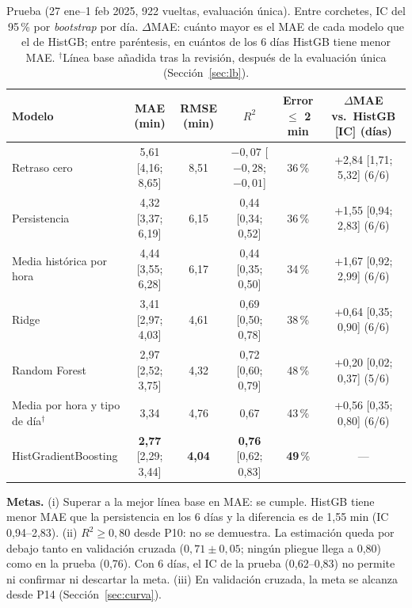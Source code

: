 \documentclass[conference,spanish]{IEEEtran}
\begin{document}
\begin{table}[t]
\centering
\caption{Prueba (27 ene--1 feb 2025, 922 vueltas, evaluación única). Entre corchetes, IC del 95\,\% por \textit{bootstrap} por día. $\Delta$MAE: cuánto mayor es el MAE de cada modelo que el de HistGB; entre paréntesis, en cuántos de los 6 días HistGB tiene menor MAE. $^\dagger$Línea base añadida tras la revisión, después de la evaluación única (Sección~\ref{sec:lb}).}
\label{tab:test}
\footnotesize
\begin{tabular}{@{}lccccc@{}}
\toprule
\textbf{Modelo} & \textbf{MAE (min)} & \textbf{RMSE (min)} & \textbf{$R^2$} & \textbf{Error $\le$ 2 min} & \textbf{$\Delta$MAE vs.\ HistGB [IC] (días)}\\
\midrule
Retraso cero & 5,61 [4,16; 8,65] & 8,51 & $-0{,}07$ [$-0{,}28$; $-0{,}01$] & 36\,\% & +2,84 [1,71; 5,32] (6/6)\\
Persistencia & 4,32 [3,37; 6,19] & 6,15 & 0,44 [0,34; 0,52] & 36\,\% & +1,55 [0,94; 2,83] (6/6)\\
Media histórica por hora & 4,44 [3,55; 6,28] & 6,17 & 0,44 [0,35; 0,50] & 34\,\% & +1,67 [0,92; 2,99] (6/6)\\
Ridge & 3,41 [2,97; 4,03] & 4,61 & 0,69 [0,50; 0,78] & 38\,\% & +0,64 [0,35; 0,90] (6/6)\\
Random Forest & 2,97 [2,52; 3,75] & 4,32 & 0,72 [0,60; 0,79] & 48\,\% & +0,20 [0,02; 0,37] (5/6)\\
Media por hora y tipo de día$^\dagger$ & 3,34 & 4,76 & 0,67 & 43\,\% & +0,56 [0,35; 0,80] (6/6)\\
HistGradientBoosting & \textbf{2,77} [2,29; 3,44] & \textbf{4,04} & \textbf{0,76} [0,62; 0,83] & \textbf{49}\,\% & ---\\
\bottomrule
\end{tabular}
\end{table}

\textbf{Metas.} (i) Superar a la mejor línea base en MAE: se cumple. HistGB tiene menor MAE que la persistencia en los 6 días y la diferencia es de 1,55 min (IC 0,94--2,83). (ii) $R^2\ge0{,}80$ desde P10: no se demuestra. La estimación queda por debajo tanto en validación cruzada ($0{,}71\pm0{,}05$; ningún pliegue llega a 0,80) como en la prueba (0,76). Con 6 días, el IC de la prueba (0,62--0,83) no permite ni confirmar ni descartar la meta. (iii) En validación cruzada, la meta se alcanza desde P14 (Sección~\ref{sec:curva}).
\end{document}
